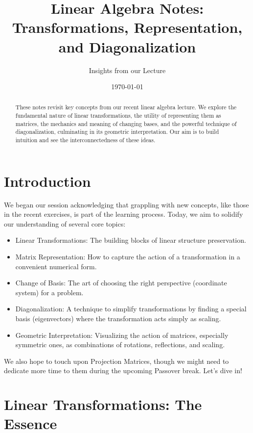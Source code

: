 \documentclass[11pt, a4paper]{article}
\theoremstyle{mytheoremstyle}
\theoremstyle{mydefstyle}
\begin{document}
\title{Linear Algebra Notes: \\ Transformations, Representation, and Diagonalization}
\author{Insights from our Lecture}
\date{\today} %
\maketitle

\begin{abstract}
These notes revisit key concepts from our recent linear algebra lecture. We explore the fundamental nature of linear transformations, the utility of representing them as matrices, the mechanics and meaning of changing bases, and the powerful technique of diagonalization, culminating in its geometric interpretation. Our aim is to build intuition and see the interconnectedness of these ideas.
\end{abstract}

\section{Introduction}

We began our session acknowledging that grappling with new concepts, like those in the recent exercises, is part of the learning process. Today, we aim to solidify our understanding of several core topics:
\begin{itemize}
    \item Linear Transformations: The building blocks of linear structure preservation.
    \item Matrix Representation: How to capture the action of a transformation in a convenient numerical form.
    \item Change of Basis: The art of choosing the right perspective (coordinate system) for a problem.
    \item Diagonalization: A technique to simplify transformations by finding a special basis (eigenvectors) where the transformation acts simply as scaling.
    \item Geometric Interpretation: Visualizing the action of matrices, especially symmetric ones, as combinations of rotations, reflections, and scaling.
\end{itemize}
We also hope to touch upon Projection Matrices, though we might need to dedicate more time to them during the upcoming Passover break. Let's dive in!

\section{Linear Transformations: The Essence}
\end{document}
